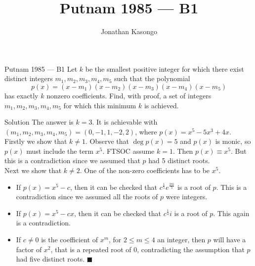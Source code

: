\documentclass{article}
\author{Jonathan Kasongo}
\title{Putnam 1985 --- B1}
\begin{document}
\maketitle

\begin{problem}{Putnam 1985 --- B1}
Let $k$ be the smallest positive integer for which there exist
distinct integers $m_1, m_2, m_3, m_4, m_5$ such that the polynomial
\[
p(x) = (x-m_1)(x-m_2)(x-m_3)(x-m_4)(x-m_5)
\]
has exactly $k$ nonzero coefficients. Find, with proof, a set of
integers $m_1, m_2, m_3, m_4, m_5$ for which this minimum $k$ is achieved.
\end{problem}

\begin{solution}{Solution}
The answer is $k=3$. It is achievable with
$(m_1,m_2,m_3,m_4,m_5) = (0,-1,1,-2,2)$, where $p(x) = x^5 - 5x^3 + 4x$.\\

Firstly we show that $k \neq 1$. Observe that $\deg p(x) = 5$ and
$p(x)$ is monic, so $p(x)$ must include the term $x^5$. FTSOC assume $k=1$.
Then $p(x) \equiv x^5$. But this is a contradiction since we assumed that
$p$ had 5 distinct roots. \\

Next we show that $k \neq 2$. One of the non-zero coefficients has to be
$x^5$.

\begin{itemize}
\item If $p(x) = x^5 - c$, then it can be checked that
$c^\frac15 e^\frac{2\pi i}{5}$ is a root of $p$. This is a contradiction
since we assumed all the roots of $p$ were integers.

\item If $p(x) = x^5 - cx$, then it can be checked that
$c^\frac14 i$ is a root of $p$. This again is a contradiction.

\item If $c\neq 0$ is the coefficient of $x^m$, for $2\leq m\leq 4$ an
integer, then $p$ will have a factor of $x^2$, that is a repeated root of 0,
contradicting the assumption that $p$ had five distinct roots.
$\blacksquare$
\end{itemize}

\end{solution}
\end{document}
